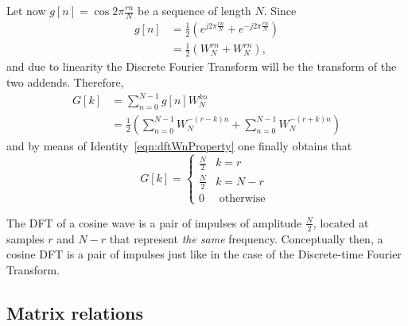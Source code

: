 \documentclass[\documentfontsize, twocolumn]{\classname}
\begin{document}
Let now $g[n] = \cos{2\pi \frac{rn}{N}}$ be a sequence of length $N$. Since
\begin{align*}
    g[n] &= \frac 1 2 \left(e^{j2\pi \frac{rn}{N}} + e^{-j2\pi \frac{rn}{N}}\right)\\
         &= \frac 1 2 \left(W_N^{rn} + W_N^{rn}\right),
\end{align*}
and due to linearity the Discrete Fourier Transform will be the transform of the two addends. Therefore,
\begin{align*}
    G[k] &= \sum_{n=0}^{N-1} g[n] W_N^{kn} \\
         &= \frac 1 2 \left(\sum_{n=0}^{N-1} W_N^{-(r-k)n} + \sum_{n=0}^{N-1} W_N^{-(r+k)n}\right)
\end{align*}
and by means of Identity~\ref{eqn:dftWnProperty} one finally obtains that
\[
    G[k] = \left\{\begin{array}{ll}
            \frac N 2 & k = r\\
            \frac N 2 & k = N - r\\
            0         & \mbox{ otherwise }
    \end{array}\right.
\]

The DFT of a cosine wave is a pair of impulses of amplitude $\frac N 2$, located at samples $r$ and $N-r$ that represent \emph{the same} frequency. Conceptually then, a cosine DFT is a pair of impulses just like in the case of the Discrete-time Fourier Transform.

\subsection{Matrix relations}
\end{document}
